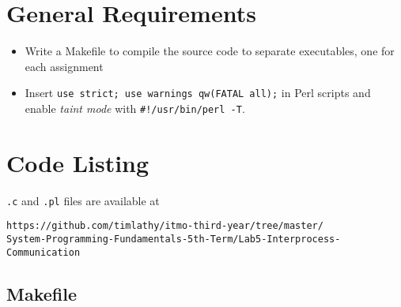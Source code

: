 \documentclass[en, listings]{labreport}
\begin{document}
\section*{General Requirements}

\begin{itemize}
\item Write a Makefile to compile the source code to separate executables,
  one for each assignment
\item Insert \verb|use strict; use warnings qw(FATAL all);| in Perl scripts
  and enable \textit{taint mode} with \verb|#!/usr/bin/perl -T|.
\end{itemize}

\section*{Code Listing}

\verb|.c| and \verb|.pl| files are available at
\begin{verbatim}
https://github.com/timlathy/itmo-third-year/tree/master/
System-Programming-Fundamentals-5th-Term/Lab5-Interprocess-Communication
\end{verbatim}

\subsection*{Makefile}


\end{document}
